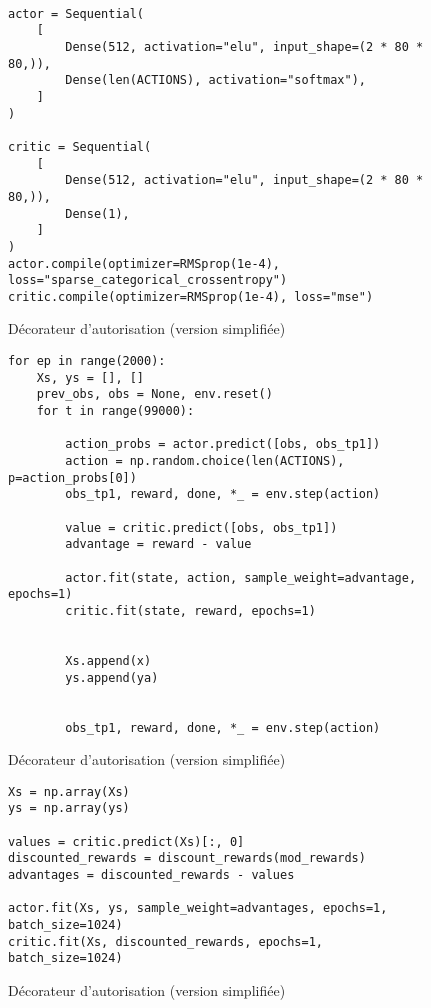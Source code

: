 

\renewcommand{\theFancyVerbLine}{
    \textcolor{mylinenumbercolor}{\ttfamily\arabic{FancyVerbLine}} %
}

\begin{figure}[!ht]
\centering
\begin{verbatim}

actor = Sequential(
    [
        Dense(512, activation="elu", input_shape=(2 * 80 * 80,)),
        Dense(len(ACTIONS), activation="softmax"),
    ]
)

critic = Sequential(
    [
        Dense(512, activation="elu", input_shape=(2 * 80 * 80,)),
        Dense(1),
    ]
)
actor.compile(optimizer=RMSprop(1e-4), loss="sparse_categorical_crossentropy")
critic.compile(optimizer=RMSprop(1e-4), loss="mse")
\end{verbatim}
\caption{Décorateur d'autorisation (version simplifiée)}
\label{fig:decorator}
\end{figure}


\begin{figure}[!ht]
\centering
\begin{verbatim}
for ep in range(2000):
    Xs, ys = [], []
    prev_obs, obs = None, env.reset()
    for t in range(99000):

        action_probs = actor.predict([obs, obs_tp1])
        action = np.random.choice(len(ACTIONS), p=action_probs[0])
        obs_tp1, reward, done, *_ = env.step(action)

        value = critic.predict([obs, obs_tp1])
        advantage = reward - value

        actor.fit(state, action, sample_weight=advantage, epochs=1)
        critic.fit(state, reward, epochs=1)


        Xs.append(x)
        ys.append(ya)


        obs_tp1, reward, done, *_ = env.step(action)

\end{verbatim}
\caption{Décorateur d'autorisation (version simplifiée)}
\label{fig:decorator}
\end{figure}

\begin{figure}[!ht]
\centering
\begin{verbatim}
Xs = np.array(Xs)
ys = np.array(ys)

values = critic.predict(Xs)[:, 0]
discounted_rewards = discount_rewards(mod_rewards)
advantages = discounted_rewards - values

actor.fit(Xs, ys, sample_weight=advantages, epochs=1, batch_size=1024)
critic.fit(Xs, discounted_rewards, epochs=1, batch_size=1024)

\end{verbatim}
\caption{Décorateur d'autorisation (version simplifiée)}
\label{fig:decorator}
\end{figure}


